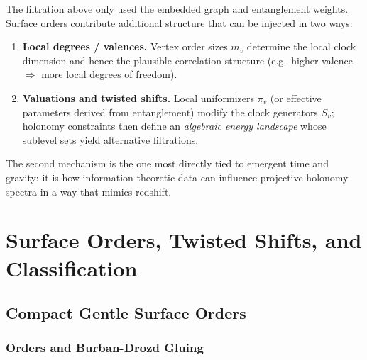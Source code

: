\documentclass[11pt,oneside]{amsbook}
\numberwithin{equation}{section}
\theoremstyle{plain}
\theoremstyle{definition}
\theoremstyle{remark}
\begin{document}
The filtration above only used the embedded graph and entanglement weights.
Surface orders contribute additional structure that can be injected in two ways:

\begin{enumerate}
\item \textbf{Local degrees / valences.} Vertex order sizes $m_v$ determine the local clock dimension and hence the plausible correlation structure (e.g.\ higher valence $\Rightarrow$ more local degrees of freedom).
\item \textbf{Valuations and twisted shifts.} Local uniformizers $\pi_v$ (or effective parameters derived from entanglement) modify the clock generators $S_v$; holonomy constraints then define an \emph{algebraic energy landscape} whose sublevel sets yield alternative filtrations.
\end{enumerate}

The second mechanism is the one most directly tied to emergent time and gravity:
it is how information-theoretic data can influence projective holonomy spectra in a way that mimics redshift.


\part{Surface Orders, Twisted Shifts, and Classification}

	\chapter{Compact Gentle Surface Orders}
	
	\section{Orders and Burban-Drozd Gluing}
\end{document}
